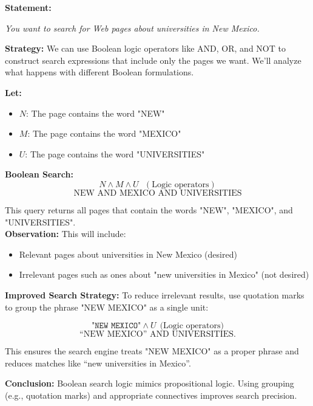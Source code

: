 \begin{tcolorbox}[title=Example 1: Boolean Searching Using Logical Operators]
\textbf{Statement:}  
\begin{center}
\textit{You want to search for Web pages about universities in New Mexico.}
\end{center}

\textbf{Strategy:}  
We can use Boolean logic operators like AND, OR, and NOT to construct search expressions that include only the pages we want. We'll analyze what happens with different Boolean formulations.

\textbf{Let:}
\begin{itemize}
    \item $N$: The page contains the word "NEW"
    \item $M$: The page contains the word "MEXICO"
    \item $U$: The page contains the word "UNIVERSITIES"
\end{itemize}
\textbf{Boolean Search:}
\[
N \land M \land U \ \ \ (\text{Logic operators})
\]
\[
\text{NEW AND MEXICO AND UNIVERSITIES}
\]

This query returns all pages that contain the words "NEW", "MEXICO", and "UNIVERSITIES".
\\
\textbf{Observation:}  
This will include:
\begin{itemize}
    \item Relevant pages about universities in New Mexico (desired)
    \item Irrelevant pages such as ones about "new universities in Mexico" (not desired)
\end{itemize}

\vspace{0.5em}

\textbf{Improved Search Strategy:}  
To reduce irrelevant results, use quotation marks to group the phrase "NEW MEXICO" as a single unit:

\[
\texttt{"NEW MEXICO"} \land U \ \ \text{(Logic operators)}
\]
\[
\text{“NEW
MEXICO” AND UNIVERSITIES.}
\]

This ensures the search engine treats "NEW MEXICO" as a proper phrase and reduces matches like “new universities in Mexico”.

\textbf{Conclusion:}  
Boolean search logic mimics propositional logic. Using grouping (e.g., quotation marks) and appropriate connectives improves search precision.
\end{tcolorbox}

